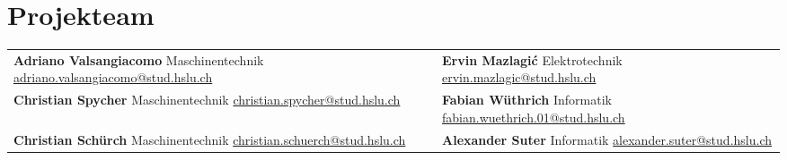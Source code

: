 \section{Projekteam}

\begin{tabularx}{\columnwidth}{XX}
	
	\textbf{Adriano Valsangiacomo} \newline
	Maschinentechnik \newline
	\href{mailto:adriano.valsangiacomo@stud.hslu.ch}{adriano.valsangiacomo@stud.hslu.ch} \newline
	
	&  
	
	\textbf{Ervin Mazlagi\'c} \newline
	Elektrotechnik \newline
	\href{mailto:ervin.mazlagic@stud.hslu.ch}{ervin.mazlagic@stud.hslu.ch} \newline 
	
	\\ 
	
	\textbf{Christian Spycher} \newline
    Maschinentechnik \newline
    \href{mailto:christian.spycher@stud.hslu.ch}{christian.spycher@stud.hslu.ch} \newline 
     
    
    & 
    
    \textbf{Fabian Wüthrich} \newline
    Informatik \newline
    \href{mailto:fabian.wuethrich.01@stud.hslu.ch}{fabian.wuethrich.01@stud.hslu.ch} \newline 
    
    \\ 
	
	\textbf{Christian Schürch} \newline
	Maschinentechnik \newline
	\href{mailto:christian.schuerch@stud.hslu.ch}{christian.schuerch@stud.hslu.ch} \newline 
	
	& 
	 
	\textbf{Alexander Suter} \newline
	Informatik \newline
	\href{mailto:alexander.suter@stud.hslu.ch}{alexander.suter@stud.hslu.ch} \newline 
	
	\\ 
\end{tabularx} 
